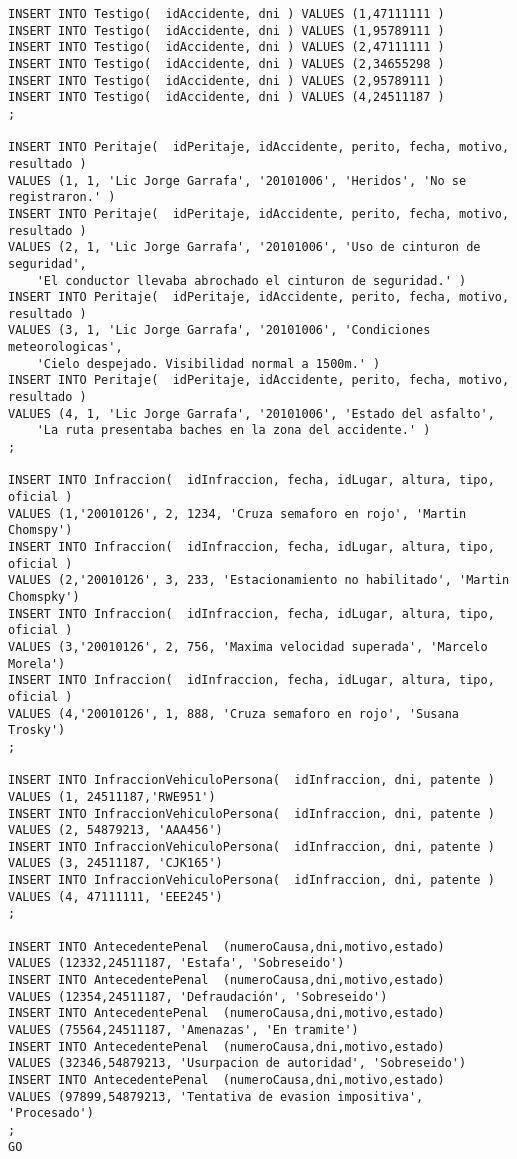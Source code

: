 {\begin{verbatim}
INSERT INTO Testigo(  idAccidente, dni ) VALUES (1,47111111 )
INSERT INTO Testigo(  idAccidente, dni ) VALUES (1,95789111 )
INSERT INTO Testigo(  idAccidente, dni ) VALUES (2,47111111 )
INSERT INTO Testigo(  idAccidente, dni ) VALUES (2,34655298 )
INSERT INTO Testigo(  idAccidente, dni ) VALUES (2,95789111 )
INSERT INTO Testigo(  idAccidente, dni ) VALUES (4,24511187 )
;

INSERT INTO Peritaje(  idPeritaje, idAccidente, perito, fecha, motivo, resultado ) 
VALUES (1, 1, 'Lic Jorge Garrafa', '20101006', 'Heridos', 'No se registraron.' )
INSERT INTO Peritaje(  idPeritaje, idAccidente, perito, fecha, motivo, resultado ) 
VALUES (2, 1, 'Lic Jorge Garrafa', '20101006', 'Uso de cinturon de seguridad', 
	'El conductor llevaba abrochado el cinturon de seguridad.' )
INSERT INTO Peritaje(  idPeritaje, idAccidente, perito, fecha, motivo, resultado ) 
VALUES (3, 1, 'Lic Jorge Garrafa', '20101006', 'Condiciones meteorologicas', 
	'Cielo despejado. Visibilidad normal a 1500m.' )
INSERT INTO Peritaje(  idPeritaje, idAccidente, perito, fecha, motivo, resultado ) 
VALUES (4, 1, 'Lic Jorge Garrafa', '20101006', 'Estado del asfalto', 
	'La ruta presentaba baches en la zona del accidente.' )
;

INSERT INTO Infraccion(  idInfraccion, fecha, idLugar, altura, tipo, oficial ) 
VALUES (1,'20010126', 2, 1234, 'Cruza semaforo en rojo', 'Martin Chomspy')
INSERT INTO Infraccion(  idInfraccion, fecha, idLugar, altura, tipo, oficial ) 
VALUES (2,'20010126', 3, 233, 'Estacionamiento no habilitado', 'Martin Chomspky')
INSERT INTO Infraccion(  idInfraccion, fecha, idLugar, altura, tipo, oficial ) 
VALUES (3,'20010126', 2, 756, 'Maxima velocidad superada', 'Marcelo Morela')
INSERT INTO Infraccion(  idInfraccion, fecha, idLugar, altura, tipo, oficial ) 
VALUES (4,'20010126', 1, 888, 'Cruza semaforo en rojo', 'Susana Trosky')
;

INSERT INTO InfraccionVehiculoPersona(  idInfraccion, dni, patente ) VALUES (1, 24511187,'RWE951')
INSERT INTO InfraccionVehiculoPersona(  idInfraccion, dni, patente ) VALUES (2, 54879213, 'AAA456')
INSERT INTO InfraccionVehiculoPersona(  idInfraccion, dni, patente ) VALUES (3, 24511187, 'CJK165')
INSERT INTO InfraccionVehiculoPersona(  idInfraccion, dni, patente ) VALUES (4, 47111111, 'EEE245')
;

INSERT INTO AntecedentePenal  (numeroCausa,dni,motivo,estado) 
VALUES (12332,24511187, 'Estafa', 'Sobreseido')
INSERT INTO AntecedentePenal  (numeroCausa,dni,motivo,estado) 
VALUES (12354,24511187, 'Defraudación', 'Sobreseido')
INSERT INTO AntecedentePenal  (numeroCausa,dni,motivo,estado) 
VALUES (75564,24511187, 'Amenazas', 'En tramite')
INSERT INTO AntecedentePenal  (numeroCausa,dni,motivo,estado) 
VALUES (32346,54879213, 'Usurpacion de autoridad', 'Sobreseido')
INSERT INTO AntecedentePenal  (numeroCausa,dni,motivo,estado) 
VALUES (97899,54879213, 'Tentativa de evasion impositiva', 'Procesado')
;
GO


\end{verbatim}}
